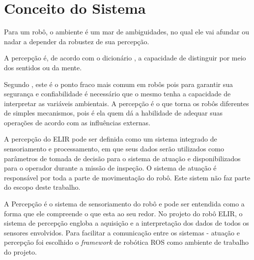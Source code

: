 \chapter{Conceito do Sistema}
\label{chap:concep}

\begin{flushright}
   \begin{list}{}{
      \setlength{\leftmargin}{4.5cm}
      \setlength{\rightmargin}{0cm}
      \setlength{\labelwidth}{0pt}
      \setlength{\labelsep}{\leftmargin}}
      \item Para um robô, o ambiente é um mar de ambiguidades, no qual ele vai afundar ou nadar a depender da robustez de sua percepção.
      \begin{list}{}{
      \setlength{\leftmargin}{0cm}
      \setlength{\rightmargin}{0cm}
      \setlength{\labelwidth}{0pt}
      \setlength{\labelsep}{\leftmargin}}
      \item \cite{Fitzpatrick}
      \end{list}
   \end{list}
\end{flushright}

A percepção é, de acordo com o dicionário , a capacidade de distinguir por meio dos sentidos ou da mente.

Segundo , este é o ponto fraco mais comum em robôs pois para garantir sua segurança e confiabilidade é necessário que o mesmo tenha a capacidade de interpretar as variáveis ambientais. A percepção é o que torna os robôs diferentes de simples mecanismos, pois é ela quem dá a habilidade de adequar suas operações de acordo com as influências externas.

A percepção do ELIR pode ser definida como um sistema integrado de sensoriamento e processamento, em que seus dados serão utilizados como parâmetros de tomada de decisão para o sistema de atuação e disponibilizados para o operador durante a missão de inspeção. O sistema de atuação é responsável por toda a parte de movimentação do robô. Este sistem não faz parte do escopo deste trabalho.

A Percepção é o sistema de sensoriamento do robô e pode ser entendida como a forma que ele compreende o que esta ao seu redor. No projeto do robô ELIR, o sistema de percepção engloba a aquisição e a interpretação dos dados de todos os sensores envolvidos. Para facilitar a comunicação entre os sistemas - atuação e percepção foi escolhido o \textit{framework} de robótica ROS como ambiente de trabalho do projeto.

